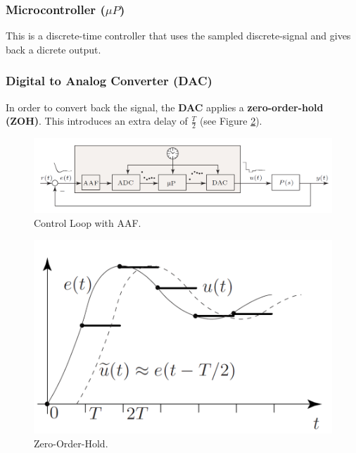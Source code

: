 \documentclass[a4paper,12 pt]{article}
\numberwithin{equation}{section}
\theoremstyle{definition}
\theoremstyle{remark}
\theoremstyle{definition}
\theoremstyle{definition}
\theoremstyle{definition}
\theoremstyle{remark}
\begin{document}
\subsubsection*{Microcontroller ($\mu P$)}
This is a discrete-time controller that uses the sampled discrete-signal and gives back a dicrete output.
\subsubsection*{Digital to Analog Converter (DAC)}
In order to convert back the signal, the \textbf{DAC} applies a \textbf{zero-order-hold (ZOH)}. This introduces an extra delay of $\frac{T}{2}$ (see Figure \ref{fig:del}).
\begin{figure}[h]
\centering\includegraphics[width=0.9\columnwidth]{aaf}
\caption{Control Loop with AAF.}
\label{fig:micro}
\end{figure}

\begin{figure}[h]
\centering\includegraphics[width=0.7\columnwidth]{del}
\caption{Zero-Order-Hold.}
\label{fig:del}
\end{figure}
\end{document}
